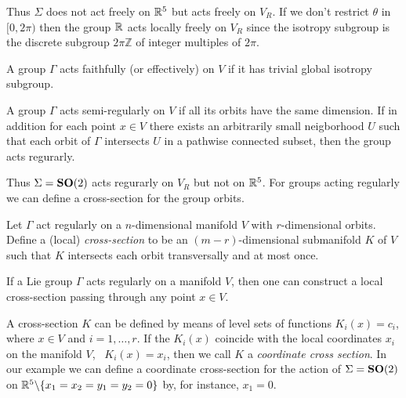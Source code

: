 Thus $\Sigma$ does not act freely on $\mathbb{R}^{5}$ but acts freely on $V_R$. If we don't 
restrict $\theta$ in $[0,2\pi)$ then the group $\mathbb{R}^{}$ acts locally freely on $V_R$
since the isotropy subgroup is the discrete subgroup $2\pi\mathbb{Z}$ of integer multiples of $2\pi$.

\begin{definition}
\label{def:faithfull}
A group $\Gamma$ acts faithfully (or effectively) on $V$ if it has trivial global isotropy subgroup.
\end{definition}

\begin{definition}
\label{def:regular}
A group $\Gamma$ acts semi-regularly on $V$ if all its orbits have the same dimension. If in addition for each point $x\in V$
there exists an arbitrarily small neigborhood $U$ such that each orbit of $\Gamma$ intersects $U$ in a pathwise connected subset, then the group
acts regurarly.
\end{definition}

Thus $\Sigma=\mathbf{SO}(2)$ acts regurarly on $V_R$ but not on $\mathbb{R}^{5}$. For groups acting regularly we can define a cross-section for the group orbits. 

\begin{definition}
\label{def:cross-section}
Let $\Gamma$ act regularly on a $n$-dimensional manifold $V$ with $r$-dimensional orbits. Define a (local) \emph{cross-section}
to be an $(m-r)$-dimensional submanifold $K$ of $V$ such that $K$ intersects each orbit transversally and at most once.
\end{definition}

\begin{proposition}
 If a Lie group $\Gamma$ acts regularly on a manifold $V$, then one can construct a local cross-section  
 passing through any point $x\in V$.
\end{proposition}

A cross-section $K$ can be defined by means of level sets of functions $K_i(x)=c_i$, where $x\in V$ and $i=1,\ldots,r$. If the $K_i(x)$
coincide with the local coordinates $x_i$ on the manifold $V$, \ie~$K_i(x)=x_i$, then we call $K$ a \emph{coordinate cross
section}. In our example we can define a coordinate cross-section for the action of $\Sigma=\mathbf{SO}(2)$ on $\mathbb{R}^{5}\backslash\{x_1=x_2=y_1=y_2=0\}$  by, for instance, $x_1=0$. 


